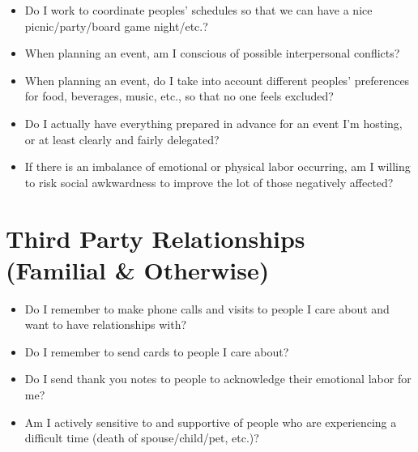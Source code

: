 \begin{itemize}
\item Do I work to coordinate peoples' schedules so that we can have a nice picnic\slash party\slash board game night\slash etc.?

\item When planning an event, am I conscious of possible interpersonal conflicts?

\item When planning an event, do I take into account different peoples' preferences for food, beverages, music, etc., so that no one feels excluded?

\item Do I actually have everything prepared in advance for an event I'm hosting, or at least clearly and fairly delegated?

\item If there is an imbalance of emotional or physical labor occurring, am I willing to risk social awkwardness to improve the lot of those negatively affected?

\end{itemize}

\part{Third Party Relationships (Familial \& Otherwise)}
\label{thirdpartyrelationshipsfamilialotherwise}

\begin{itemize}
\item Do I remember to make phone calls and visits to people I care about and want to have relationships with?

\item Do I remember to send cards to people I care about?

\item Do I send thank you notes to people to acknowledge their emotional labor for me?

\item Am I actively sensitive to and supportive of people who are experiencing a difficult time (death of spouse\slash child\slash pet, etc.)?

\end{itemize}
